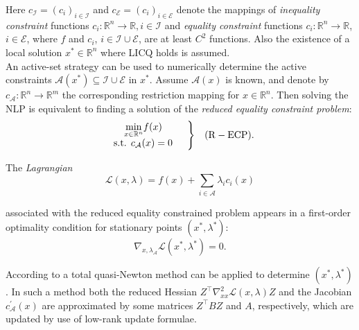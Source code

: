 \documentclass{svmult}
\begin{document}
\noindent Here $c_{\mathcal{I}}=(c_i)_{i\in\mathcal{I}}$ and $c_{\mathcal{E}}=(c_i)_{i\in\mathcal{E}}$ denote the mappings of \textit{inequality constraint} functions $c_i:\mathbb{R}^n\rightarrow \mathbb{R},i \in \mathcal{I}$ and \textit{equality constraint} functions $c_i:\mathbb{R}^n\rightarrow \mathbb{R}$, $i \in \mathcal{E}$, where $f$ and $c_i$, $i \in \mathcal{I} \cup\mathcal{E}$, are at least $C^2$ functions. Also the existence of a local solution $x^* \in \mathbb{R}^n$ where LICQ holds is assumed.\\

\noindent An active-set strategy can be used to numerically determine the active constraints $\mathcal{A}(x^*) \subseteq \mathcal{I} \cup \mathcal{E}$ in $x^*$. Assume $\mathcal{A}(x)$ is known, and denote by $c_{\mathcal{A}}:\mathbb{R}^n\rightarrow \mathbb{R}^m$ the corresponding restriction mapping for $x \in \mathbb{R}^n$. Then solving the NLP is equivalent to finding a solution of the \textit{reduced equality constraint problem}:
\begin{eqnarray*}
	&\left.\begin{array}{c}
		 \underset{x\in \mathbb{R}^n}{\min} f(x) \\ \mbox{s.t. }c_{\mathcal{A}}(x) = 0
	\end{array}	\quad \right\} & \hfill \mathrm{(R-ECP)}.
\end{eqnarray*}

\noindent The \textit{Lagrangian} 
\begin{equation*}
	\mathcal{L}(x,\lambda)=f(x)+\underset{i\in \mathcal{A}}{\sum}\lambda_ic_i(x)
\end{equation*}

\noindent  associated with the reduced equality constrained problem appears in a first-order optimality condition for stationary points $(x^*,\lambda^*)$:
\begin{equation}
\label{tb:stat}
	\nabla_{x,\lambda_{\mathcal{A}}} \mathcal{L}(x^*,\lambda^*)=0.	
\end{equation}

\noindent According to \cite{tb:ANDREAS} a total quasi-Newton method  can be applied to determine $(x^*,\lambda^*)$. In such a method both the reduced Hessian $Z^\top \nabla^2_{xx} \mathcal{L}(x,\lambda) Z$ and the Jacobian $c^\prime_{\mathcal{A}}(x)$ are approximated by some matrices $Z^\top B Z$ and $A$, respectively, which  are updated by use of low-rank update formulae. \\
\end{document}

